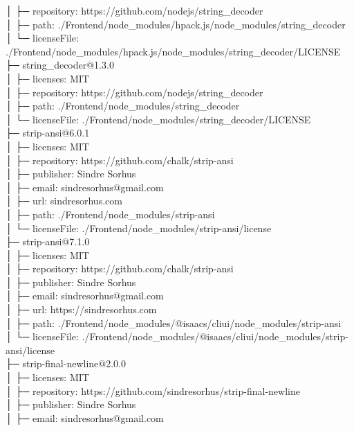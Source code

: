 \documentclass[
    paper=a4,
    twoside=false,
    parskip=half,
    listof=entryprefix,
    listof=totoc,
    index=totoc,
    bibliography=totoc,
    headsepline,
]{scrbook}
\begin{document}
    │  ├─ repository: https://github.com/nodejs/string\_decoder\\
    │  ├─ path: ./Frontend/node\_modules/hpack.js/node\_modules/string\_decoder\\
    │  └─ licenseFile: ./Frontend/node\_modules/hpack.js/node\_modules/string\_decoder/LICENSE\\
    ├─ string\_decoder@1.3.0\\
    │  ├─ licenses: MIT\\
    │  ├─ repository: https://github.com/nodejs/string\_decoder\\
    │  ├─ path: ./Frontend/node\_modules/string\_decoder\\
    │  └─ licenseFile: ./Frontend/node\_modules/string\_decoder/LICENSE\\
    ├─ strip-ansi@6.0.1\\
    │  ├─ licenses: MIT\\
    │  ├─ repository: https://github.com/chalk/strip-ansi\\
    │  ├─ publisher: Sindre Sorhus\\
    │  ├─ email: sindresorhus@gmail.com\\
    │  ├─ url: sindresorhus.com\\
    │  ├─ path: ./Frontend/node\_modules/strip-ansi\\
    │  └─ licenseFile: ./Frontend/node\_modules/strip-ansi/license\\
    ├─ strip-ansi@7.1.0\\
    │  ├─ licenses: MIT\\
    │  ├─ repository: https://github.com/chalk/strip-ansi\\
    │  ├─ publisher: Sindre Sorhus\\
    │  ├─ email: sindresorhus@gmail.com\\
    │  ├─ url: https://sindresorhus.com\\
    │  ├─ path: ./Frontend/node\_modules/@isaacs/cliui/node\_modules/strip-ansi\\
    │  └─ licenseFile: ./Frontend/node\_modules/@isaacs/cliui/node\_modules/strip-ansi/license\\
    ├─ strip-final-newline@2.0.0\\
    │  ├─ licenses: MIT\\
    │  ├─ repository: https://github.com/sindresorhus/strip-final-newline\\
    │  ├─ publisher: Sindre Sorhus\\
    │  ├─ email: sindresorhus@gmail.com\\
\end{document}
